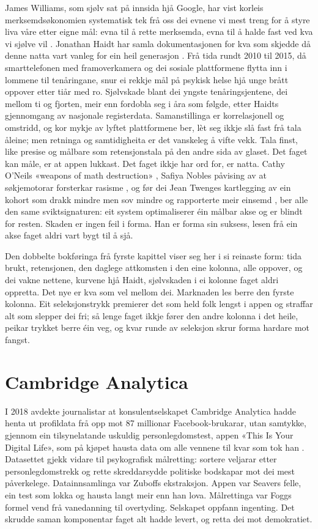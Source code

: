 James Williams, som sjølv sat på innsida hjå Google, har vist korleis merksemdsøkonomien systematisk tek frå oss dei evnene vi mest treng for å styre liva våre etter eigne mål: evna til å rette merksemda, evna til å halde fast ved kva vi sjølve vil \autocite{williams2018}. Jonathan Haidt har samla dokumentasjonen for kva som skjedde då denne natta vart vanleg for ein heil generasjon \autocite{haidt2024}. Frå tida rundt 2010 til 2015, då smarttelefonen med framoverkamera og dei sosiale plattformene flytta inn i lommene til tenåringane, snur ei rekkje mål på psykisk helse hjå unge brått oppover etter tiår med ro. Sjølvskade blant dei yngste tenåringsjentene, dei mellom ti og fjorten, meir enn fordobla seg i åra som følgde, etter Haidts gjennomgang av nasjonale registerdata. Samanstillinga er korrelasjonell og omstridd, og kor mykje av lyftet plattformene ber, lèt seg ikkje slå fast frå tala åleine; men retninga og samtidigheita er det vanskeleg å vifte vekk. Tala finst, like presise og målbare som retensjonstala på den andre sida av glaset. Det faget kan måle, er at appen lukkast. Det faget ikkje har ord for, er natta. Cathy O'Neils «weapons of math destruction» \autocite{oneil2016}, Safiya Nobles påvising av at søkjemotorar forsterkar rasisme \autocite{noble2018}, og før dei Jean Twenges kartlegging av ein kohort som drakk mindre men sov mindre og rapporterte meir einsemd \autocite{twenge2017}, ber alle den same sviktsignaturen: eit system optimaliserer éin målbar akse og er blindt for resten. Skaden er ingen feil i forma. Han er forma sin suksess, lesen frå ein akse faget aldri vart bygt til å sjå.

Den dobbelte bokføringa frå fyrste kapittel viser seg her i si reinaste form: tida brukt, retensjonen, den daglege attkomsten i den eine kolonna, alle oppover, og dei vakne nettene, kurvene hjå Haidt, sjølvskaden i ei kolonne faget aldri oppretta. Det nye er kva som vel mellom dei. Marknaden les berre den fyrste kolonna. Eit seleksjonstrykk premierer det som held folk lengst i appen og straffar alt som slepper dei fri; så lenge faget ikkje fører den andre kolonna i det heile, peikar trykket berre éin veg, og kvar runde av seleksjon skrur forma hardare mot fangst.

\section{Cambridge Analytica}

I 2018 avdekte journalistar at konsulentselskapet Cambridge Analytica hadde henta ut profildata frå opp mot 87 millionar Facebook-brukarar, utan samtykke, gjennom ein tilsynelatande uskuldig personlegdomstest, appen «This Is Your Digital Life», som på kjøpet hausta data om alle vennene til kvar som tok han \autocite{cadwalladr2018}. Datasettet gjekk vidare til psykografisk målretting: sortere veljarar etter personlegdomstrekk og rette skreddarsydde politiske bodskapar mot dei mest påverkelege. Datainnsamlinga var Zuboffs ekstraksjon. Appen var Seavers felle, ein test som lokka og hausta langt meir enn han lova. Målrettinga var Foggs formel vend frå vanedanning til overtyding. Selskapet oppfann ingenting. Det skrudde saman komponentar faget alt hadde levert, og retta dei mot demokratiet.

